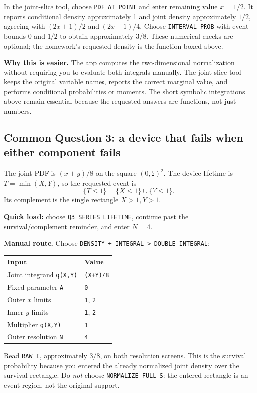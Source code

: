 In the joint-slice tool, choose \texttt{PDF AT POINT} and enter remaining value $x=1/2$. It reports conditional density approximately 1 and joint density approximately $1/2$, agreeing with $(2x+1)/2$ and $(2x+1)/4$. Choose \texttt{INTERVAL PROB} with event bounds 0 and $1/2$ to obtain approximately $3/8$. These numerical checks are optional; the homework's requested density is the function boxed above.

\textbf{Why this is easier.} The app computes the two-dimensional normalization without requiring you to evaluate both integrals manually. The joint-slice tool keeps the original variable names, reports the correct marginal value, and performs conditional probabilities or moments. The short symbolic integrations above remain essential because the requested answers are functions, not just numbers.

\clearpage
\subsection{Common Question 3: a device that fails when either component fails}
The joint PDF is $(x+y)/8$ on the square $(0,2)^2$. The device lifetime is $T=\min(X,Y)$, so the requested event is
\[
\{T\le1\}=\{X\le1\}\cup\{Y\le1\}.
\]
Its complement is the single rectangle $X>1,Y>1$.

\textbf{Quick load:} choose \texttt{Q3 SERIES LIFETIME}, continue past the survival/complement reminder, and enter $N=4$.\par
\textbf{Manual route.} Choose \texttt{DENSITY + INTEGRAL > DOUBLE INTEGRAL}:
\begin{center}
\begin{tabular}{@{}ll@{}}
\toprule Input & Value\\\midrule
Joint integrand \texttt{q(X,Y)} & \texttt{(X+Y)/8}\\
Fixed parameter \texttt{A} & \texttt{0}\\
Outer $x$ limits & \texttt{1}, \texttt{2}\\
Inner $y$ limits & \texttt{1}, \texttt{2}\\
Multiplier \texttt{g(X,Y)} & \texttt{1}\\
Outer resolution \texttt{N} & \texttt{4}\\\bottomrule
\end{tabular}
\end{center}
Read \texttt{RAW I}, approximately $3/8$, on both resolution screens. This is the survival probability because you entered the already normalized joint density over the survival rectangle. Do \emph{not} choose \texttt{NORMALIZE FULL S}: the entered rectangle is an event region, not the original support.


